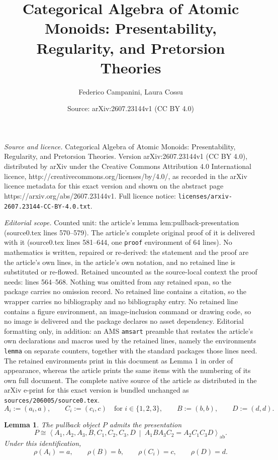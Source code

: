 \documentclass[10pt,a4paper]{amsart}
\title{Categorical Algebra of Atomic Monoids: Presentability, Regularity, and Pretorsion Theories}
\author{Federico Campanini, Laura Cossu}
\date{Source: arXiv:2607.23144v1 (CC BY 4.0)}
\newtheorem{lemma}{Lemma}
\begin{document}
\maketitle

\noindent\emph{Source and licence.} Categorical Algebra of Atomic Monoids: Presentability, Regularity, and Pretorsion Theories. Version arXiv:2607.23144v1 (CC BY 4.0), distributed by arXiv under the Creative Commons Attribution 4.0 International licence, http://creativecommons.org/licenses/by/4.0/, as recorded in the arXiv licence metadata for this exact version and shown on the abstract page https://arxiv.org/abs/2607.23144v1. Full licence notice: \texttt{licenses/arxiv-2607.23144-CC-BY-4.0.txt}.\par\smallskip

\noindent\textit{Editorial scope.} Counted unit: the article's lemma lem:pullback-presentation (source0.tex lines 570--579). The article's complete original proof of it is delivered with it (source0.tex lines 581--644, one \texttt{proof} environment of 64 lines). No mathematics is written, repaired or re-derived: the statement and the proof are the article's own lines, in the article's own notation, and no retained line is substituted or re-flowed.  Retained uncounted as the source-local context the proof needs: lines 564--568.  Nothing was omitted from any retained span, so the package carries no omission record.  No retained line contains a citation, so the wrapper carries no bibliography and no bibliography entry.  No retained line contains a figure environment, an image-inclusion command or drawing code, so no image is delivered and the package declares no asset dependency.  Editorial formatting only, in addition: an AMS \texttt{amsart} preamble that restates the article's own declarations and macros used by the retained lines, namely the environments \texttt{lemma} on separate counters, together with the standard packages those lines need.  The retained environments print in this document as Lemma 1 in order of appearance, whereas the article prints the same items with the numbering of its own full document.  The complete native source of the article as distributed in the arXiv e-print for this exact version is bundled unchanged as \texttt{sources/206005/source0.tex}.
 \begin{equation}\label{eq:ABCD}
 A_i:=(a_i,a),\qquad C_i:=(c_i,c)
 \quad \text{for }i\in\{1,2,3\},\qquad 
 B:=(b,b),\qquad D:=(d,d).
 \end{equation}

\begin{lemma}\label{lem:pullback-presentation}
The pullback object \(P\) admits the presentation
$$
P\cong \left\langle A_1,A_2,A_3,B,C_1,C_2,C_3,D \ \middle|\ A_1BA_3C_2=A_2C_1C_3D \right\rangle_{\mathrm{ab}}.
$$
Under this identification,
$$
\rho(A_i)=a,\qquad \rho(B)=b,\qquad \rho(C_i)=c,\qquad \rho(D)=d.
$$
\end{lemma}
\end{document}
